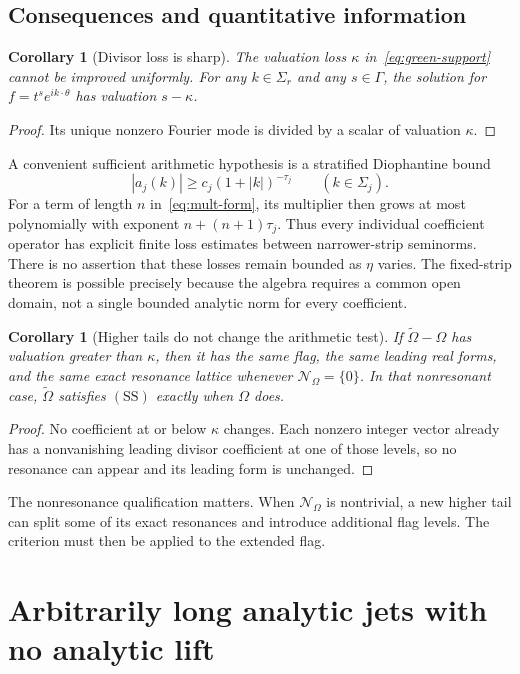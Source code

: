 \documentclass[11pt,letterpaper]{article}
\newtheorem{corollary}[theorem]{Corollary}
\theoremstyle{definition}
\theoremstyle{remark}
\newcommand{\res}{\mathcal N_{\Omega}}
\newcommand{\SDcond}{\mathrm{SS}}
\numberwithin{equation}{section}
\begin{document}
\subsection{Consequences and quantitative information}

\begin{corollary}[Divisor loss is sharp]\label{cor:sharp-linear}
The valuation loss $\kappa$ in~\eqref{eq:green-support} cannot be improved
uniformly.  For any $k\in\Sigma_r$ and any $s\in\Gamma$, the solution for
$f=t^s e^{ik\cdot\theta}$ has valuation $s-\kappa$.
\end{corollary}
\begin{proof}
Its unique nonzero Fourier mode is divided by a scalar of valuation
$\kappa$.
\end{proof}

A convenient sufficient arithmetic hypothesis is a stratified Diophantine
bound
\[
 |a_j(k)|\ge c_j(1+|k|)^{-\tau_j}\qquad(k\in\Sigma_j).
\]
For a term of length $n$ in~\eqref{eq:mult-form}, its multiplier then grows
at most polynomially with exponent $n+(n+1)\tau_j$.
Thus every individual coefficient operator has explicit finite loss
estimates between narrower-strip seminorms.  There is no assertion that
these losses remain bounded as $\eta$ varies.  The fixed-strip theorem is
possible precisely because the algebra requires a common open domain, not
a single bounded analytic norm for every coefficient.

\begin{corollary}[Higher tails do not change the arithmetic test]\label{cor:tail}
If $\widetilde\Omega-\Omega$ has valuation greater than $\kappa$, then it
has the same flag, the same leading real forms, and the same exact resonance
lattice whenever $\res=\{0\}$.  In that nonresonant case,
$\widetilde\Omega$ satisfies $(\SDcond)$ exactly when $\Omega$ does.
\end{corollary}
\begin{proof}
No coefficient at or below $\kappa$ changes.  Each nonzero integer vector
already has a nonvanishing leading divisor coefficient at one of those
levels, so no resonance can appear and its leading form is unchanged.
\end{proof}

The nonresonance qualification matters.  When $\res$ is nontrivial, a new
higher tail can split some of its exact resonances and introduce additional
flag levels.  The criterion must then be applied to the extended flag.

\section{Arbitrarily long analytic jets with no analytic lift}
\label{sec:jets}
\end{document}
